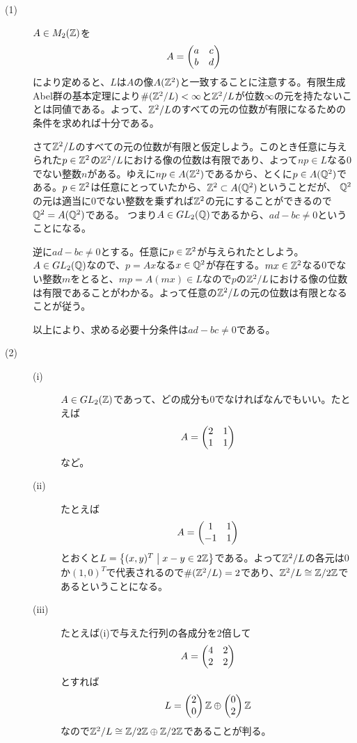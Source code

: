 \begin{sol} ${}$
  \begin{description}
    \item[(1)] $A \in M_2({\mathbb Z})$を
    \[
    A = \begin{pmatrix}  a& c \\ b &d \end{pmatrix}
    \]
    により定めると、$L$は$A$の像$A({\mathbb Z}^2)$と一致することに注意する。有限生成Abel群の基本定理により$\# ({\mathbb Z}^2 / L ) < \infty$と${\mathbb Z}^2 / L$が位数$\infty$の元を持たないことは同値である。よって、${\mathbb Z}^2 / L$のすべての元の位数が有限になるための条件を求めれば十分である。

    さて${\mathbb Z}^2 / L$のすべての元の位数が有限と仮定しよう。このとき任意に与えられた$p \in {\mathbb Z}^2$の${\mathbb Z}^2 / L $における像の位数は有限であり、よって$np \in L$なる$0$でない整数$n$がある。ゆえに$n p \in A({\mathbb Z}^2)$であるから、とくに$p \in A({\mathbb Q}^2)$である。$p \in {\mathbb Z}^2$は任意にとっていたから、${\mathbb Z}^2 \subset A({\mathbb Q}^2)$ということだが、
    ${\mathbb Q}^2$の元は適当に$0$でない整数を乗ずれば${\mathbb Z}^2$の元にすることができるので${\mathbb Q}^2 = A({\mathbb Q}^2)$である。
    つまり$A \in GL_2({\mathbb Q})$であるから、$ad - bc \neq 0$ということになる。

    逆に$ad - bc \neq 0$とする。任意に$p \in {\mathbb Z}^2$が与えられたとしよう。$A \in GL_2({\mathbb Q})$なので、$p = Ax$なる$x \in {\mathbb Q}^2$が存在する。$m x \in {\mathbb Z}^2$なる$0$でない整数$m$をとると、$mp = A(mx) \in L$なので$p$の${\mathbb Z}^2 / L$における像の位数は有限であることがわかる。よって任意の${\mathbb Z}^2 / L $の元の位数は有限となることが従う。

    以上により、求める必要十分条件は$ad-bc \neq 0$である。
    \item[(2)]
    \begin{description}
      \item[(i)] $A \in GL_2({\mathbb Z})$であって、どの成分も$0$でなければなんでもいい。たとえば
      \[
      A = \begin{pmatrix}  2 &1 \\ 1& 1  \end{pmatrix}
      \]
      など。
      \item[(ii)] たとえば
      \[
      A = \begin{pmatrix}  1& 1 \\ -1& 1 \end{pmatrix}
      \]
      とおくと$L=\left\{ (x,y)^T  \mathrel{} \middle| \mathrel{} x - y \in 2{\mathbb Z} \right\}$である。よって${\mathbb Z}^2 / L$の各元は$0$か$(1,0)^T$で代表されるので$\# ({\mathbb Z}^2 / L)=2$であり、${\mathbb Z}^2 / L \cong \mathbb{Z} / 2 \mathbb{Z}$であるということになる。
      \item[(iii)] たとえば(i)で与えた行列の各成分を$2$倍して
      \[
      A = \begin{pmatrix}  4 &2 \\ 2& 2  \end{pmatrix}
      \]
      とすれば
      \[
      L = \begin{pmatrix} 2 \\ 0 \end{pmatrix} {\mathbb Z} \oplus  \begin{pmatrix} 0 \\ 2 \end{pmatrix} {\mathbb Z}
      \]
      なので${\mathbb Z}^2 / L \cong \mathbb{Z} / 2 \mathbb{Z} \oplus \mathbb{Z} / 2 \mathbb{Z}$であることが判る。
    \end{description}
  \end{description}
\end{sol}

